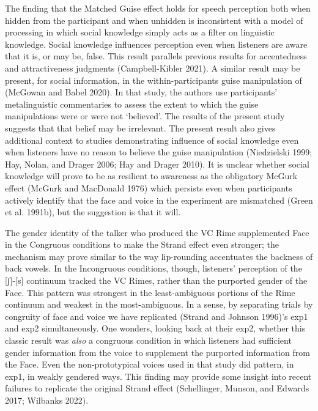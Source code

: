\documentclass[
  letterpaper,
  DIV=11,
  numbers=noendperiod]{scrartcl}
\begin{document}
The finding that the Matched Guise effect holds for speech perception
both when hidden from the participant and when unhidden is inconsistent
with a model of processing in which social knowledge simply acts as a
filter on linguistic knowledge. Social knowledge influences perception
even when listeners are aware that it is, or may be, false. This result
parallels previous results for accentedness and attractiveness judgments
(Campbell-Kibler 2021). A similar result may be present, for social
information, in the within-participants guise manipulation of (McGowan
and Babel 2020). In that study, the authors use participants'
metalinguistic commentaries to assess the extent to which the guise
manipulations were or were not `believed'. The results of the present
study suggests that that belief may be irrelevant. The present result
also gives additional context to studies demonstrating influence of
social knowledge even when listeners have no reason to believe the guise
manipulation (Niedzielski 1999; Hay, Nolan, and Drager 2006; Hay and
Drager 2010). It is unclear whether social knowledge will prove to be as
resilient to awareness as the obligatory McGurk effect (McGurk and
MacDonald 1976) which persists even when participants actively identify
that the face and voice in the experiment are mismatched (Green et al.
1991b), but the suggestion is that it will.

The gender identity of the talker who produced the VC Rime supplemented
Face in the Congruous conditions to make the Strand effect even
stronger; the mechanism may prove similar to the way lip-rounding
accentuates the backness of back vowels. In the Incongruous conditions,
though, listeners' perception of the {[}ʃ{]}-{[}s{]} continuum tracked
the VC Rimes, rather than the purported gender of the Face. This pattern
was strongest in the least-ambiguous portions of the Rime continuum and
weakest in the most-ambiguous. In a sense, by separating trials by
congruity of face and voice we have replicated (Strand and Johnson
1996)'s exp1 and exp2 simultaneously. One wonders, looking back at their
exp2, whether this classic result was \emph{also} a congruous condition
in which listeners had sufficient gender information from the voice to
supplement the purported information from the Face. Even the
non-prototypical voices used in that study did pattern, in exp1, in
weakly gendered ways. This finding may provide some insight into recent
failures to replicate the original Strand effect (Schellinger, Munson,
and Edwards 2017; Wilbanks 2022).
\end{document}
